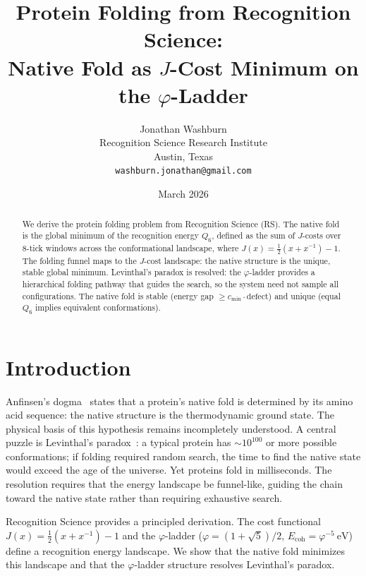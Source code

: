 \documentclass[12pt,a4paper]{article}
\title{Protein Folding from Recognition Science:\\
Native Fold as $J$-Cost Minimum on the $\varphi$-Ladder}
\author{Jonathan Washburn\\
Recognition Science Research Institute\\
Austin, Texas\\
\texttt{washburn.jonathan@gmail.com}}
\date{March 2026}
\theoremstyle{definition}
\theoremstyle{remark}
\begin{document}
\maketitle

\begin{abstract}
We derive the protein folding problem from Recognition Science (RS).
The native fold is the global minimum of the recognition energy $Q_6$,
defined as the sum of $J$-costs over 8-tick windows across the
conformational landscape, where $J(x) = \frac{1}{2}(x + x^{-1}) - 1$.
The folding funnel maps to the $J$-cost landscape: the native
structure is the unique, stable global minimum.  Levinthal's paradox
is resolved: the $\varphi$-ladder provides a hierarchical folding
pathway that guides the search, so the system need not sample all
configurations.  The native fold is stable (energy gap $\geq c_{\min}
\cdot \mathrm{defect}$) and unique (equal $Q_6$ implies equivalent
conformations).
\end{abstract}

\section{Introduction}
\label{sec:intro}

Anfinsen's dogma~\cite{Anfinsen} states that a protein's native fold is
determined by its amino acid sequence: the native structure is the
thermodynamic ground state.  The physical basis of this hypothesis
remains incompletely understood.  A central puzzle is Levinthal's
paradox~\cite{Levinthal}: a typical protein has $\sim 10^{100}$ or more
possible conformations; if folding required random search, the time to
find the native state would exceed the age of the universe.  Yet
proteins fold in milliseconds.  The resolution requires that the
energy landscape be funnel-like, guiding the chain toward the native
state rather than requiring exhaustive search.

Recognition Science provides a principled derivation.  The cost
functional $J(x) = \frac{1}{2}(x + x^{-1}) - 1$ and the $\varphi$-ladder
($\varphi = (1+\sqrt{5})/2$, $E_{\mathrm{coh}} = \varphi^{-5}~\mathrm{eV}$)
define a recognition energy landscape.  We show that the native fold
minimizes this landscape and that the $\varphi$-ladder structure
resolves Levinthal's paradox.

\end{document}
